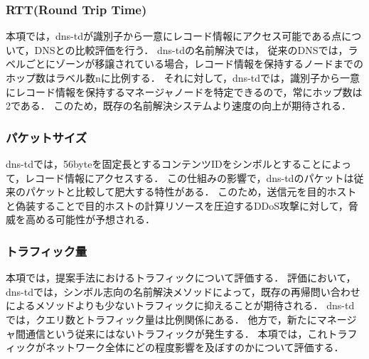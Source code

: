 \subsubsection{RTT(Round Trip Time)}
本項では，dns-tdが識別子から一意にレコード情報にアクセス可能である点について，DNSとの比較評価を行う．
dns-tdの名前解決では，
従来のDNSでは，ラベルごとにゾーンが移譲されている場合，レコード情報を保持するノードまでのホップ数はラベル数nに比例する．
それに対して，dns-tdでは，識別子から一意にレコード情報を保持するマネージャノードを特定できるので，常にホップ数は2である．
このため，既存の名前解決システムより速度の向上が期待される．
\subsubsection{パケットサイズ}
dns-tdでは，56byteを固定長とするコンテンツIDをシンボルとすることによって，レコード情報にアクセスする．
この仕組みの影響で，dns-tdのパケットは従来のパケットと比較して肥大する特性がある．
このため，送信元を目的ホストと偽装することで目的ホストの計算リソースを圧迫するDDoS攻撃に対して，脅威を高める可能性が予想される．
\subsubsection{トラフィック量}
本項では，提案手法におけるトラフィックについて評価する．
評価において，
dns-tdでは，シンボル志向の名前解決メソッドによって，既存の再帰問い合わせによるメソッドよりも少ないトラフィックに抑えることが期待される．
dns-tdでは，クエリ数とトラフィック量は比例関係にある．
他方で，新たにマネージャ間通信という従来にはないトラフィックが発生する．
本項では，これトラフィックがネットワーク全体にどの程度影響を及ぼすのかについて評価する．

